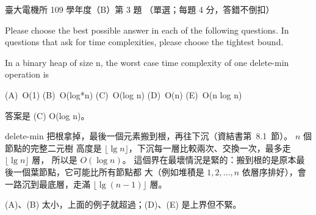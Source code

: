 \begin{pastexam}[label={px:ntu-109-ee-ds-03}]{臺大電機所 109 學年度（B）第 3 題}
（單選；每題 4 分，答錯不倒扣）

Please choose the best possible answer in each of the following questions. In questions that ask
for time complexities, please choose the tightest bound.

In a binary heap of size n, the worst case time complexity of one delete-min operation is

(A)~O(1) \qquad (B)~O(log*n) \qquad (C)~O(log n) \qquad (D)~O(n) \qquad (E)~O(n log n)
\end{pastexam}

\begin{pastsoln}
答案是 (C) O(log n)。

delete-min 把根拿掉，最後一個元素搬到根，再往下沉（資結書第~8.1~節）。 $n$ 個節點的完整二元樹
高度是 $\lfloor \lg n \rfloor$，下沉每一層比較兩次、交換一次，最多走 $\lfloor \lg n \rfloor$ 層，
所以是 $O(\log n)$。 這個界在最壞情況是緊的：搬到根的是原本最後一個葉節點，它可能比所有節點都
大（例如堆積是 $1, 2, \ldots, n$ 依層序排好），會一路沉到最底層，走滿 $\lfloor \lg(n-1) \rfloor$ 層。

(A)、(B) 太小，上面的例子就超過；(D)、(E) 是上界但不緊。
\end{pastsoln}
